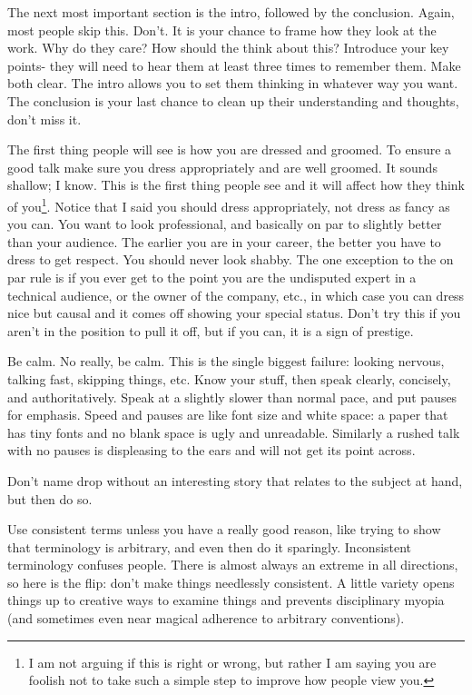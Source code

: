 The next most important section is the intro, followed by the conclusion.  Again, most people skip this.  Don't. It is your chance to frame how they look at the work.  Why do they care?  How should the think about this?  Introduce your key points- they will need to hear them at least three times to remember them.  Make both clear.  The intro allows you to set them thinking in whatever way you want. The conclusion is your last chance to clean up their understanding and thoughts, don't miss it.

The first thing people will see is how you are dressed and groomed.  To ensure a good talk make sure you dress appropriately and are well groomed.  It sounds shallow; I know.  This is the first thing people see and it will affect how they think of you\footnote{I am not arguing if this is right or wrong, but rather I am saying you are foolish not to take such a simple step to improve how people view you.}.  Notice that I said you should dress appropriately, not dress as fancy as you can.  You want to look professional, and basically on par to slightly better than your audience.  The earlier you are in your career, the better you have to dress to get respect.  You should never look shabby.  The one exception to the on par rule is if you ever get to the point you are the undisputed expert in a technical audience, or the owner of the company, etc., in which case you can dress nice but causal and it comes off showing your special status.  Don't try this if you aren't in the position to pull it off, but if you can, it is a sign of prestige.

Be calm.  No really, be calm.  This is the single biggest failure: looking nervous, talking fast, skipping things, etc.  Know your stuff, then speak clearly, concisely, and authoritatively.  Speak at a slightly slower than normal pace, and put pauses for emphasis.  Speed and pauses are like font size and white space: a paper that has tiny fonts and no blank space is ugly and unreadable.  Similarly a rushed talk with no pauses is displeasing to the ears and will not get its point across.

Don't name drop without an interesting story that relates to the subject at hand, but then do so.

Use consistent terms unless you have a really good reason, like trying to show that terminology is arbitrary, and even then do it sparingly.  Inconsistent terminology confuses people.  There is almost always an extreme in all directions, so here is the flip: don't make things needlessly consistent.  A little variety opens things up to creative ways to examine things and prevents disciplinary myopia (and sometimes even near magical adherence to arbitrary conventions).

